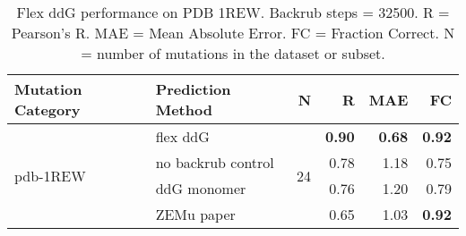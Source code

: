 \begin{table}
  \begin{tabular}{llrrrr}
\toprule
Mutation Category &   Prediction Method &   N &    R &  MAE &   FC \\
\midrule
 \multirow{ 4}{*}{pdb-1REW} & flex ddG & \multirow{ 4}{*}{24} & \textbf{0.90} & \textbf{0.68} & \textbf{0.92}  \\
 & no backrub control & & 0.78 & 1.18 & 0.75  \\
 & ddG monomer & & 0.76 & 1.20 & 0.79  \\
 & ZEMu paper & & 0.65 & 1.03 & \textbf{0.92}  \\
\bottomrule
\end{tabular}
  \caption[Flex ddG performance on PDB 1REW]{
    Flex ddG performance on PDB 1REW. Backrub steps = 32500. R = Pearson's R. MAE = Mean Absolute Error. FC = Fraction Correct. N = number of mutations in the dataset or subset.
  } \label{tab:table-pdb-1REW}
\end{table}
